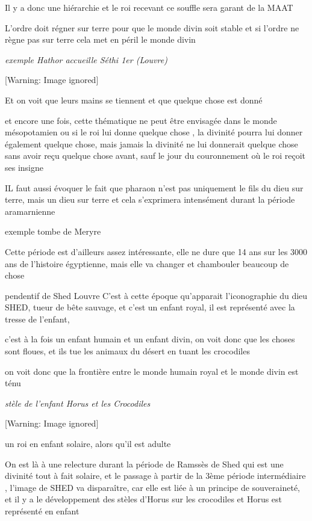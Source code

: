 \documentclass[a4paper,10pt]{article}
\begin{document}
Il y a donc une hiérarchie et le roi recevant ce souffle sera garant de
la MAAT

L'ordre doit régner sur terre pour que le monde divin
soit stable et si l'ordre ne règne pas sur terre cela
met en péril le monde divin

\textit{exemple Hathor accueille Séthi 1er (Louvre)}

  [Warning: Image ignored] %
 

Et on voit que leurs mains se tiennent et que quelque chose est donné

et encore une fois, cette thématique ne peut être envisagée dans le
monde mésopotamien ou si le roi lui donne quelque chose , la divinité
pourra lui donner également quelque chose,  mais jamais la divinité ne
lui donnerait quelque chose sans avoir reçu quelque chose avant, sauf
le jour du couronnement où le roi reçoit ses insigne

IL faut aussi évoquer le fait que pharaon n'est pas
uniquement le fils du dieu sur terre, mais un dieu sur terre  et cela
s'exprimera intensément durant la période aramarnienne


exemple tombe de Meryre

Cette période est d'ailleurs assez intéressante, elle
ne dure que 14 ans sur les 3000 ans de l'histoire
égyptienne, mais elle va changer et chambouler beaucoup de chose

pendentif de Shed Louvre  C'est à cette époque
qu'apparait l'iconographie du dieu
SHED, tueur de bête sauvage, et c'est un enfant royal,
il est représenté avec la tresse de l'enfant, 

c'est à la fois un enfant humain et un enfant divin, on
voit donc que les choses sont floues, et ils tue les animaux du désert
en tuant les crocodiles

on voit donc que la frontière entre le monde humain royal et le monde
divin est ténu

\textit{stèle de l'enfant Horus et les Crocodiles}

  [Warning: Image ignored] %
 

un roi en enfant solaire, alors qu'il est adulte

On est là à une relecture durant la période de Ramssès de Shed qui est
une divinité tout à fait solaire, et le passage à partir de la 3ème
période intermédiaire , l'image de SHED va
disparaître, car elle est liée à un principe de souveraineté,  et il y
a le développement des stèles d'Horus sur les
crocodiles et Horus est représenté en enfant
\end{document}
